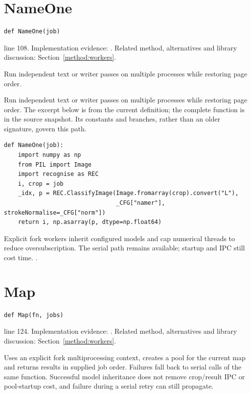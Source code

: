 \section{NameOne}\label{fn:web-lineworkers:NameOne}
\begin{lstlisting}[style=sig]
def NameOne(job)
\end{lstlisting}
 line 108. Implementation evidence: \cite{code2026}. Related method, alternatives and library discussion: Section~\ref{method:workers}.


Run independent text or writer passes on multiple processes while restoring page order.


Run independent text or writer passes on multiple processes while restoring page order. The excerpt below is from the current definition; the complete function is in the source snapshot. Its constants and branches, rather than an older signature, govern this path.


\begin{lstlisting}[style=plain]
def NameOne(job):
    import numpy as np
    from PIL import Image
    import recognise as REC
    i, crop = job
    _idx, p = REC.ClassifyImage(Image.fromarray(crop).convert("L"),
                                _CFG["namer"], strokeNormalise=_CFG["norm"])
    return i, np.asarray(p, dtype=np.float64)
\end{lstlisting}
Explicit fork workers inherit configured models and cap numerical threads to reduce oversubscription. The serial path remains available; startup and IPC still cost time. \cite{pythonmp,numpymatmul}.


\section{Map}\label{fn:web-lineworkers:Map}
\begin{lstlisting}[style=sig]
def Map(fn, jobs)
\end{lstlisting}
 line 124. Implementation evidence: \cite{code2026}. Related method, alternatives and library discussion: Section~\ref{method:workers}.


Uses an explicit fork multiprocessing context, creates a pool for the current map and returns results in supplied job order. Failures fall back to serial calls of the same function. Successful model inheritance does not remove crop/result IPC or pool-startup cost, and failure during a serial retry can still propagate.


